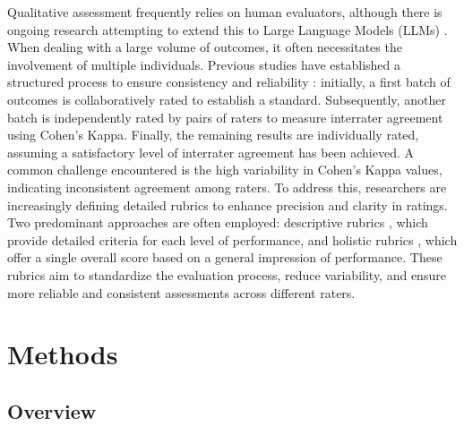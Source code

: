 \documentclass[preprint,12pt]{elsarticle}
\begin{document}
Qualitative assessment frequently relies on human evaluators, although there is ongoing research attempting to extend this to Large Language Models (LLMs) \cite{Song2024}. When dealing with a large volume of outcomes, it often necessitates the involvement of multiple individuals. Previous studies have established a structured process to ensure consistency and reliability \cite{Naismith2023} : initially, a first batch of outcomes is collaboratively rated to establish a standard. Subsequently, another batch is independently rated by pairs of raters to measure interrater agreement using Cohen's Kappa. Finally, the remaining results are individually rated, assuming a satisfactory level of interrater agreement has been achieved. A common challenge encountered is the high variability in Cohen's Kappa values, indicating inconsistent agreement among raters. To address this, researchers are increasingly defining detailed rubrics to enhance precision and clarity in ratings. Two predominant approaches are often employed: descriptive rubrics \cite{Moore2023}, which provide detailed criteria for each level of performance, and holistic rubrics \cite{Naismith2023}, which offer a single overall score based on a general impression of performance. These rubrics aim to standardize the evaluation process, reduce variability, and ensure more reliable and consistent assessments across different raters.



\section{Methods}
\label{sec3}

\subsection{Overview}
\label{subsec1}
\end{document}

